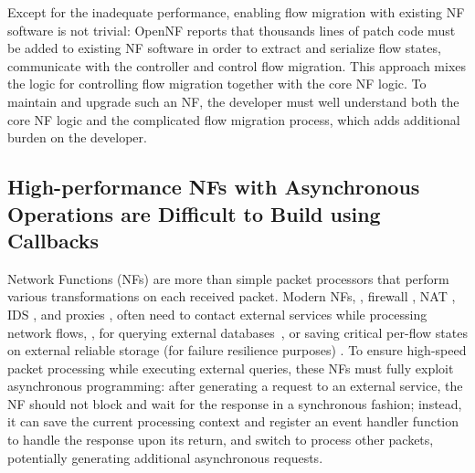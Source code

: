 Except for the inadequate performance, enabling flow migration with existing NF software is not trivial: OpenNF \cite{gember2015opennf} reports that thousands lines of patch code must be added to existing NF software \cite{bro, squid} in order to extract and serialize flow states, communicate with the controller and control flow migration. This approach mixes the logic for controlling flow migration together with the core NF logic. To maintain and upgrade such an NF, the developer must well understand both the core NF logic and the complicated flow migration process, which adds additional burden on the developer.

\subsection{High-performance NFs with Asynchronous Operations are Difficult to Build using Callbacks}

Network Functions (NFs) are more than simple packet processors that perform various transformations on each received packet. Modern NFs, \eg, firewall \cite{201545}, NAT \cite{201545}, IDS \cite{bro}, and proxies \cite{haproxy, project-clearwater}, often need to contact external services while processing network flows, \eg, for
querying external databases~\cite{telephone-number-mapping, bro-scripting-tutorial}, or saving critical per-flow states on external reliable storage (for failure resilience purposes) \cite{201545}. To ensure high-speed packet processing while executing external queries, these NFs must fully exploit asynchronous programming: after generating a request to an external service, the NF should not block and wait for the response in a synchronous fashion; instead, it can save the current processing context and register an event handler function to handle the response upon its return, and switch to process other packets, potentially generating additional asynchronous requests.



